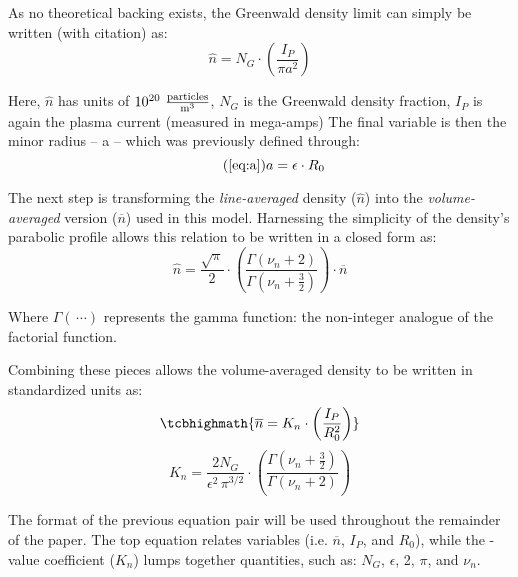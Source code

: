 As no theoretical backing exists, the Greenwald density limit can simply be written (with citation) as: \cite{greenwald}
\begin{equation}
	\hat n = N_G \cdot \left( \frac{ I_P }{ \pi a^2} \right)
\end{equation}

Here, $\hat n$ has units of $10^{20} \ \frac{\textnormal{particles}}{\textnormal{m}^3}$, $N_G$ is the Greenwald density fraction,  $I_P$ is again the plasma current (measured in mega-amps)  The final variable is then the minor radius -- a -- which was previously defined through:
\begin{equation}
	\tag{\ref{eq:a}}
	a = \epsilon \cdot R_0
\end{equation}

The next step is transforming the \emph{line-averaged} density ($\hat n$) into the \emph{volume-averaged} version ($\overline n$) used in this model. Harnessing the simplicity of the density's parabolic profile allows this relation to be written in a closed form as:
 \begin{equation}
 	\hat n = \frac{\sqrt{\pi}}{2} \cdot \left( \frac{\Gamma \left( \nu_n + 2 \right)}{\Gamma \left( \nu_n + \frac{3}{2} \right)} \right) \cdot \overline n 
 \end{equation}
 
 Where $\Gamma( \, \cdots)$ represents the gamma function: the non-integer analogue of the factorial function.
 
 Combining these pieces allows the volume-averaged density to be written in standardized units  as:
 \begin{equation}
 	\label{eq:greenwald}
 	\tcbhighmath{
 	\overline n = K_n \cdot \left( \frac{I_P}{R_0^2} \right)
 	}
 \end{equation}
 \begin{equation}
 	K_n = \frac{2 N_G}{\epsilon^2 \, \pi^{3/2} } \cdot \left( \frac{\Gamma \left( \nu_n + \frac{3}{2} \right)}{\Gamma \left( \nu_n + 2 \right)} \right)
\end{equation}
 
The format of the previous equation pair will be used throughout the remainder of the paper. The top equation relates  variables (i.e. $\overline n$, $I_P$, and $R_0$), while the -value coefficient ($K_n$) lumps together  quantities, such as: $N_G$, $\epsilon$, 2, $\pi$, and $\nu_n$.

